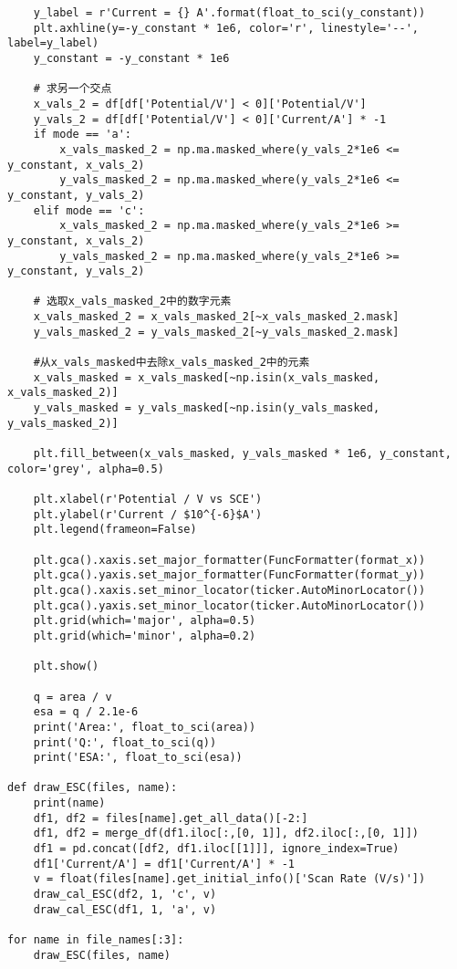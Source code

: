 \begin{verbatim}
    y_label = r'Current = {} A'.format(float_to_sci(y_constant))
    plt.axhline(y=-y_constant * 1e6, color='r', linestyle='--', label=y_label)
    y_constant = -y_constant * 1e6

    # 求另一个交点
    x_vals_2 = df[df['Potential/V'] < 0]['Potential/V']
    y_vals_2 = df[df['Potential/V'] < 0]['Current/A'] * -1
    if mode == 'a':
        x_vals_masked_2 = np.ma.masked_where(y_vals_2*1e6 <= y_constant, x_vals_2)
        y_vals_masked_2 = np.ma.masked_where(y_vals_2*1e6 <= y_constant, y_vals_2)
    elif mode == 'c':
        x_vals_masked_2 = np.ma.masked_where(y_vals_2*1e6 >= y_constant, x_vals_2)
        y_vals_masked_2 = np.ma.masked_where(y_vals_2*1e6 >= y_constant, y_vals_2)
    
    # 选取x_vals_masked_2中的数字元素
    x_vals_masked_2 = x_vals_masked_2[~x_vals_masked_2.mask]
    y_vals_masked_2 = y_vals_masked_2[~y_vals_masked_2.mask]

    #从x_vals_masked中去除x_vals_masked_2中的元素
    x_vals_masked = x_vals_masked[~np.isin(x_vals_masked, x_vals_masked_2)]
    y_vals_masked = y_vals_masked[~np.isin(y_vals_masked, y_vals_masked_2)]

    plt.fill_between(x_vals_masked, y_vals_masked * 1e6, y_constant, color='grey', alpha=0.5)

    plt.xlabel(r'Potential / V vs SCE')
    plt.ylabel(r'Current / $10^{-6}$A')
    plt.legend(frameon=False)
    
    plt.gca().xaxis.set_major_formatter(FuncFormatter(format_x))
    plt.gca().yaxis.set_major_formatter(FuncFormatter(format_y))
    plt.gca().xaxis.set_minor_locator(ticker.AutoMinorLocator())
    plt.gca().yaxis.set_minor_locator(ticker.AutoMinorLocator())
    plt.grid(which='major', alpha=0.5)
    plt.grid(which='minor', alpha=0.2)

    plt.show()
    
    q = area / v
    esa = q / 2.1e-6
    print('Area:', float_to_sci(area))
    print('Q:', float_to_sci(q))
    print('ESA:', float_to_sci(esa))

def draw_ESC(files, name):
    print(name)
    df1, df2 = files[name].get_all_data()[-2:]
    df1, df2 = merge_df(df1.iloc[:,[0, 1]], df2.iloc[:,[0, 1]])
    df1 = pd.concat([df2, df1.iloc[[1]]], ignore_index=True)
    df1['Current/A'] = df1['Current/A'] * -1
    v = float(files[name].get_initial_info()['Scan Rate (V/s)'])
    draw_cal_ESC(df2, 1, 'c', v)
    draw_cal_ESC(df1, 1, 'a', v)

for name in file_names[:3]:
    draw_ESC(files, name)
\end{verbatim}

